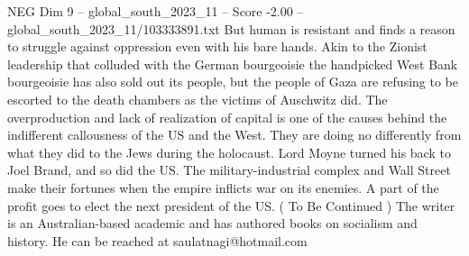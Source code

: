 \begin{textsample}{NEG Dim 9 – global\_south\_2023\_11 – Score -2.00 – global\_south\_2023\_11/103333891.txt}
But human is resistant and finds a reason to struggle against oppression even with his bare hands.
Akin to the Zionist leadership that colluded with the German bourgeoisie the handpicked West Bank bourgeoisie has also sold out its people, but the people of Gaza are refusing to be escorted to the death chambers as the victims of Auschwitz did.
The overproduction and lack of realization of capital is one of the causes behind the indifferent callousness of the US and the West.
They are doing no differently from what they did to the Jews during the holocaust.
Lord Moyne turned his back to Joel Brand, and so did the US.
The military-industrial complex and Wall Street make their fortunes when the empire inflicts war on its enemies.
A part of the profit goes to elect the next president of the US. ( To Be Continued ) The writer is an Australian-based academic and has authored books on socialism and history.
He can be reached at saulatnagi@hotmail.com

\end{textsample}

